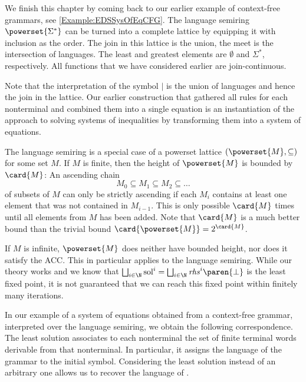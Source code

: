 \documentclass[../../diss.tex]{subfiles}
\begin{document}
We finish this chapter by coming back to our earlier example of context-free grammars, see \eg \cref{Example:EDSSysOfEqCFG}.
The language semiring $\powerset{\Sigma^*}$ can be turned into a complete lattice by equipping it with inclusion as the order.
The join in this lattice is the union, the meet is the intersection of languages.
The least and greatest elements are $\emptyset$ and $\Sigma^*$, respectively.
All functions that we have considered earlier are join-continuous.

Note that the interpretation of the symbol $\mid$ is the union of languages and hence the join in the lattice.
Our earlier construction that gathered all rules for each nonterminal and combined them into a single equation is an instantiation of the approach to solving systems of inequalities by transforming them into a system of equations.

The language semiring is a special case of a powerset lattice $(\powerset{M},\subseteq)$ for some set $M$.
If $M$ is finite, then the height of $\powerset{M}$ is bounded by $\card{M}$:
An ascending chain
\[
    M_0 \subseteq M_1 \subseteq M_2 \subseteq \ldots
\]
of subsets of $M$ can only be strictly ascending if each $M_i$ contains at least one element that was not contained in $M_{i-1}$.
This is only possible $\card{M}$ times until all elements from $M$ has been added.
Note that $\card{M}$ is a much better bound than the trivial bound $\card{\powerset{M}} = 2^{\card{M}}$.

If $M$ is infinite, $\powerset{M}$ does neither have bounded height, nor does it satisfy the ACC.\@
This in particular applies to the language semiring.
While our theory works and we know that $\bigsqcup_{i \in \N} \soli{i} = \bigsqcup_{i \in \N} \rhs^i\paren{\bot}$ is the least fixed point, it is not guaranteed that we can reach this fixed point within finitely many iterations.

In our example of a system of equations obtained from a context-free grammar, interpreted over the language semiring, we obtain the following correspondence.
The least solution associates to each nonterminal the set of finite terminal words derivable from that nonterminal.
In particular, it assigns the language of the grammar to the initial symbol.
Considering the least solution instead of an arbitrary one allows us to recover the language of .
\end{document}
